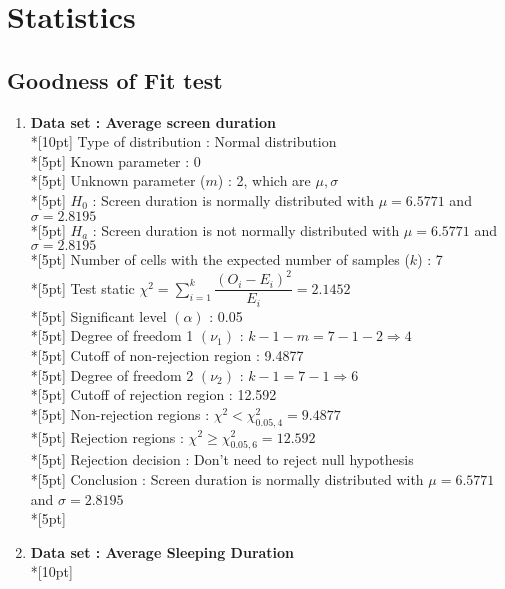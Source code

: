 \section*{Statistics}
\subsection*{Goodness of Fit test}
\begin{enumerate}
    \item \textbf{Data set : Average screen duration}\\*[10pt]
        Type of distribution : Normal distribution\\*[5pt]
        Known parameter : 0\\*[5pt]
        Unknown parameter ($m$) : 2, which are \(\mu, \sigma\)\\*[5pt]
        $H_0$ : Screen duration is normally distributed with $\mu=6.5771$ and $\sigma=2.8195$\\*[5pt]
        $H_a$ : Screen duration is not normally distributed with $\mu=6.5771$ and $\sigma=2.8195$\\*[5pt]
        Number of cells with the expected number of samples ($k$) : 7\\*[5pt]
        Test static \(\chi^2=\displaystyle\sum\limits^k_{i=1}\dfrac{\left(O_i-E_i\right)^2}{E_i} = 2.1452\)\\*[5pt]
        Significant level \(\left(\alpha\right)\) : 0.05\\*[5pt]
        Degree of freedom 1 \((\nu_1)\) : $k - 1 - m = 7 - 1 - 2 \Rightarrow 4$\\*[5pt]
        Cutoff of non-rejection region : 9.4877\\*[5pt]
        Degree of freedom 2 \((\nu_2)\) : $k - 1 = 7 - 1 \Rightarrow 6$\\*[5pt]
        Cutoff of rejection region : 12.592\\*[5pt]
        Non-rejection regions : \(\chi^2 < \chi^2_{0.05, 4}=9.4877\)\\*[5pt]
        Rejection regions : \(\chi^2 \geq \chi^2_{0.05, 6}=12.592\)\\*[5pt]
        Rejection decision : Don't need to reject null hypothesis\\*[5pt]
        Conclusion : Screen duration is normally distributed with $\mu=6.5771$ and $\sigma=2.8195$\\*[5pt]
    \item \textbf{Data set : Average Sleeping Duration}\\*[10pt]

\end{enumerate}
